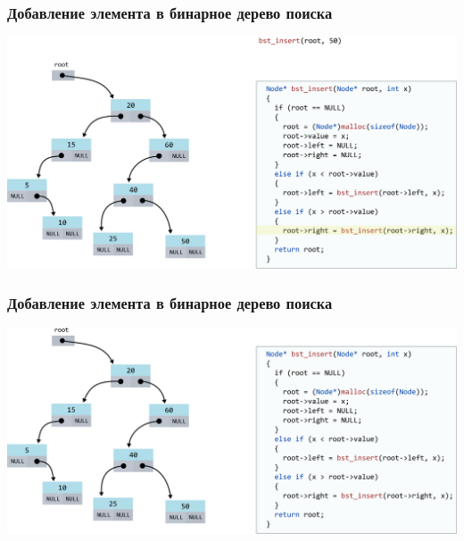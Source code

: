 \documentclass[10pt,pdf,hyperref={unicode}]{beamer}
\begin{document}
\begin{frame}[fragile]
\frametitle{Добавление элемента в бинарное дерево поиска}
\begin{center}
\includegraphics[width=\imageSizeMult\linewidth]{../images/codetree/codetree21.png}
\end{center}
\end{frame}

\begin{frame}[fragile]
\frametitle{Добавление элемента в бинарное дерево поиска}
\begin{center}
\includegraphics[width=\imageSizeMult\linewidth]{../images/codetree/codetree22.png}
\end{center}
\end{frame}
\end{document}

